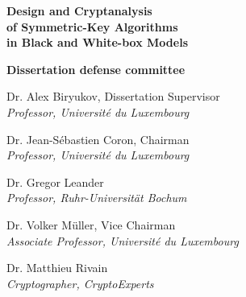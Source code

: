 \begin{titlepage}
\begin{center}
\HRule
\vspace{0.3cm}
{\LARGE \bfseries
Design and Cryptanalysis \\
of Symmetric-Key Algorithms \\
in Black and White-box Models
\par}
\vspace{0.3cm}
\HRule

\vspace{0.7cm} %
 
\if{}
\begin{flushleft}
\textbf{\Large Dissertation defense committee} \\
\vspace{0.2cm}

Dr. Alex Biryukov, Dissertation Supervisor\\
\emph{\small Professor, Université du Luxembourg}\\
\vspace{0.1cm}

Dr. Jean-Sébastien Coron, Chairman\\
\emph{\small Professor, Université du Luxembourg}\\
\vspace{0.1cm}

Dr. Gregor Leander\\
\emph{\small Professor, Ruhr-Universität Bochum}\\
\vspace{0.1cm}

Dr. Volker Müller, Vice Chairman\\
\emph{\small Associate Professor, Université du Luxembourg}\\
\vspace{0.1cm}

Dr. Matthieu Rivain\\
\emph{\small Cryptographer, CryptoExperts}\\
\vspace{0.1cm}
\end{flushleft}
\fi

\vfill
\end{center}
\end{titlepage}